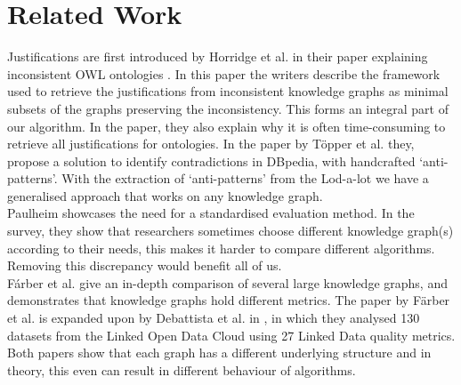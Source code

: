 \documentclass{article}
\begin{document}
\section{Related Work}
Justifications are first introduced by Horridge et al. in their paper explaining inconsistent OWL ontologies \cite{Horridge:2009}. In this paper the writers describe the framework used to retrieve the justifications from inconsistent knowledge graphs as minimal subsets of the graphs preserving the inconsistency. This forms an integral part of our algorithm. In the paper, they also explain why it is often time-consuming to retrieve all justifications for ontologies. In the paper by T\"{o}pper et al. \cite{Topper:2012} they, propose a solution to identify contradictions in DBpedia, with handcrafted `anti-patterns'. With the extraction of `anti-patterns' from the Lod-a-lot we have a generalised approach that works on any knowledge graph. \\
Paulheim \cite{HeikoP:2016} showcases the need for a standardised evaluation method. In the survey, they show that researchers sometimes choose different knowledge graph(s) according to their needs, this makes it harder to compare different algorithms. Removing this discrepancy would benefit all of us.\\ 
F\'arber et al. \cite{MichaelF:2017} give an in-depth comparison of several large knowledge graphs, and demonstrates that knowledge graphs hold different metrics. The paper by F\"arber et al. \cite{MichaelF:2017} is expanded upon by Debattista et al. in \cite{Debattista:2018}, in which they analysed 130 datasets from the Linked Open Data Cloud using 27 Linked Data quality metrics. Both papers show that each graph has a different underlying structure and in theory, this even can result in different behaviour of algorithms.
\end{document}

